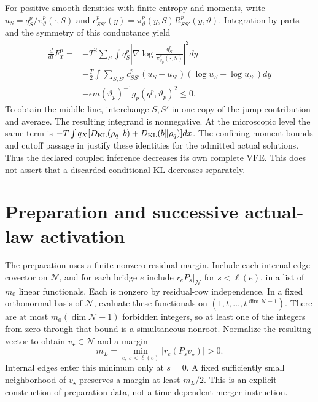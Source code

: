 For positive smooth densities with finite entropy and moments, write
\(u_S=q^p_S/\pi_\vartheta^p(\cdot,S)\) and
\(c^p_{SS'}(y)=\pi_\vartheta^p(y,S)R^p_{SS'}(y,\vartheta)\).
Integration by parts and the symmetry of this conductance yield
\begin{equation}
\begin{aligned}
\frac{d}{dt}F_T^p
={}&-T^2\sum_S\int q_S^p
       \left|\nabla\log
           \frac{q_S^p}{\pi_{\vartheta_p}^p(\cdot,S)}\right|^2dy\\
 &-\frac T2\int\sum_{S,S'}c^p_{SS'}
       (u_S-u_{S'})(\log u_S-\log u_{S'})dy\\
 &-\epsilon m(\vartheta_p)^{-1}g_p(q^p,\vartheta_p)^2
 \le0.
\end{aligned}
\label{eq:rg-formation-dissipation}
\end{equation}
To obtain the middle line, interchange \(S,S'\) in one copy of the
jump contribution and average. The resulting integrand is nonnegative.
At the microscopic level the same term is
\(-T\int q_X[D_{\mathrm{KL}}(\rho_q\Vert b)+D_{\mathrm{KL}}(b\Vert\rho_q)]dx\).
The confining moment bounds and cutoff passage in
justify these identities for the admitted actual solutions. Thus the
declared coupled inference decreases its own complete VFE. This does
not assert that a discarded-conditional KL decreases separately.

\section{Preparation and successive actual-law activation}
\label{sec:rg-formation-preparation}

The preparation uses a finite nonzero residual margin. Include each
internal edge covector on \(\mathcal N\), and for each bridge \(e\)
include \(r_eP_s|_{\mathcal N}\) for \(s<\ell(e)\), in a list of
\(m_0\) linear functionals. Each is nonzero by residual-row
independence. In a fixed orthonormal basis of \(\mathcal N\), evaluate
these functionals on \((1,t,\ldots,t^{\dim\mathcal N-1})\).
There are at most \(m_0(\dim\mathcal N-1)\) forbidden integers, so
at least one of the integers from zero through that bound is a
simultaneous nonroot. Normalize the resulting vector to obtain
\(v_\star\in\mathcal N\) and a margin
\begin{equation}
m_L=\min_{e,\ s<\ell(e)}
       |r_e(P_sv_\star)|>0.
\label{eq:rg-formation-preparation-margin}
\end{equation}
Internal edges enter this minimum only at \(s=0\). A fixed sufficiently
small neighborhood of \(v_\star\) preserves a margin at least \(m_L/2\).
This is an explicit construction of preparation data, not a time-dependent
merger instruction. 

